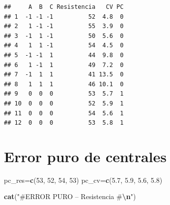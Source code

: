 \documentclass[
]{article}
\newenvironment{Shaded}{\begin{snugshade}}{\end{snugshade}}
\newcommand{\CommentTok}[1]{\textcolor[rgb]{0.56,0.35,0.01}{\textit{#1}}}
\newcommand{\DecValTok}[1]{\textcolor[rgb]{0.00,0.00,0.81}{#1}}
\newcommand{\FloatTok}[1]{\textcolor[rgb]{0.00,0.00,0.81}{#1}}
\newcommand{\FunctionTok}[1]{\textcolor[rgb]{0.13,0.29,0.53}{\textbf{#1}}}
\newcommand{\NormalTok}[1]{#1}
\newcommand{\OtherTok}[1]{\textcolor[rgb]{0.56,0.35,0.01}{#1}}
\newcommand{\SpecialCharTok}[1]{\textcolor[rgb]{0.81,0.36,0.00}{\textbf{#1}}}
\newcommand{\StringTok}[1]{\textcolor[rgb]{0.31,0.60,0.02}{#1}}
\begin{document}
\begin{Shaded}
\end{Shaded}

\begin{verbatim}
##     A  B  C Resistencia   CV PC
## 1  -1 -1 -1          52  4.8  0
## 2   1 -1 -1          55  3.9  0
## 3  -1  1 -1          50  5.6  0
## 4   1  1 -1          54  4.5  0
## 5  -1 -1  1          44  9.8  0
## 6   1 -1  1          49  7.2  0
## 7  -1  1  1          41 13.5  0
## 8   1  1  1          46 10.1  0
## 9   0  0  0          53  5.7  1
## 10  0  0  0          52  5.9  1
## 11  0  0  0          54  5.6  1
## 12  0  0  0          53  5.8  1
\end{verbatim}

\begin{Shaded}
\end{Shaded}

\section{Error puro de centrales}\label{error-puro-de-centrales}

\begin{Shaded}
\begin{Highlighting}[]
\NormalTok{pc\_res}\OtherTok{=}\FunctionTok{c}\NormalTok{(}\DecValTok{53}\NormalTok{, }\DecValTok{52}\NormalTok{, }\DecValTok{54}\NormalTok{, }\DecValTok{53}\NormalTok{)}
\NormalTok{pc\_cv}\OtherTok{=}\FunctionTok{c}\NormalTok{(}\FloatTok{5.7}\NormalTok{, }\FloatTok{5.9}\NormalTok{, }\FloatTok{5.6}\NormalTok{, }\FloatTok{5.8}\NormalTok{)}

\FunctionTok{cat}\NormalTok{(}\StringTok{"\#ERROR PURO – Resistencia \#}\SpecialCharTok{\textbackslash{}n}\StringTok{"}\NormalTok{)}
\end{Highlighting}
\end{Shaded}
\end{document}
